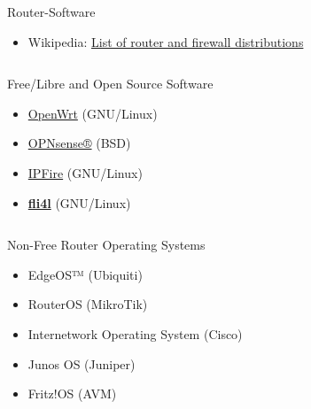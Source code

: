 \documentclass[t]{beamer}
\makeatletter
\newcommand{\strong}[1]{\@strong{#1}}
\newcommand{\@@strong}[1]{\textbf{\let\@strong\@@@strong#1}}
\newcommand{\@@@strong}[1]{\textnormal{\let\@strong\@@strong#1}}
\let\@strong\@@strong
\makeatother
\begin{document}
\begin{frame}{Router-Software}
    \begin{itemize}
        \item Wikipedia: \href{https://en.wikipedia.org/wiki/List_of_router_and_firewall_distributions}{List of router and firewall distributions}
    \end{itemize}
    \begin{columns}[c]
        \begin{column}{0.65\textwidth}
            \begin{exampleblock}{Free/Libre and Open Source Software}
                \begin{itemize}
                    \item \href{https://openwrt.org/}{OpenWrt} (GNU/Linux)
                    \item \href{https://opnsense.org/}{OPNsense®} (BSD)
                    \item \href{https://www.ipfire.org/}{IPFire} (GNU/Linux)
                    \item \strong{\href{https://www.fli4l.de/}{fli4l}} (GNU/Linux)
                \end{itemize}
            \end{exampleblock}
        \end{column}
        \begin{column}{0.32\textwidth}
            
        \end{column}
    \end{columns}
    \begin{alertblock}{Non-Free Router Operating Systems}
        \begin{itemize}
            \item EdgeOS™ (Ubiquiti)
            \item RouterOS (MikroTik)
            \item Internetwork Operating System (Cisco)
            \item Junos OS (Juniper)
            \item Fritz!OS (AVM)
        \end{itemize}
    \end{alertblock}
\end{frame}
\end{document}
